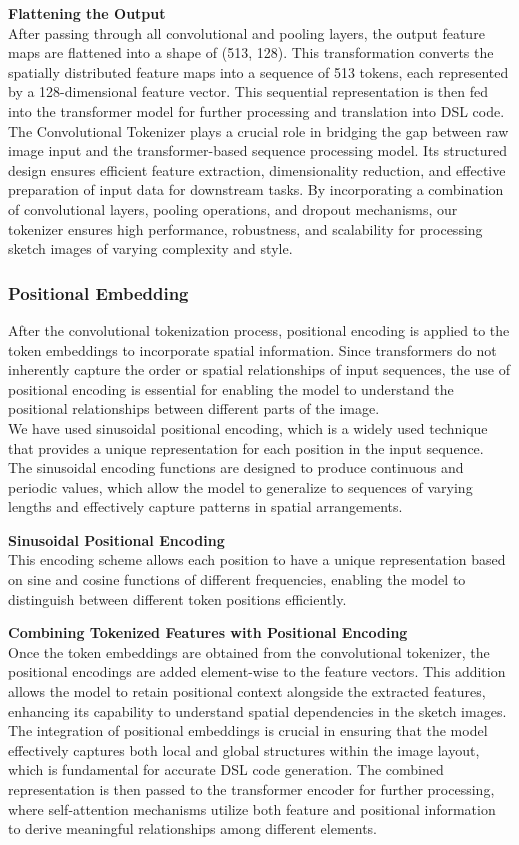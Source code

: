 \textbf{Flattening the Output}\\
After passing through all convolutional and pooling layers, the output feature maps are flattened into a shape of (513, 128). This transformation converts the spatially distributed feature maps into a sequence of 513 tokens, each represented by a 128-dimensional feature vector. This sequential representation is then fed into the transformer model for further processing and translation into DSL code.
The Convolutional Tokenizer plays a crucial role in bridging the gap between raw image input and the transformer-based sequence processing model. Its structured design ensures efficient feature extraction, dimensionality reduction, and effective preparation of input data for downstream tasks. By incorporating a combination of convolutional layers, pooling operations, and dropout mechanisms, our tokenizer ensures high performance, robustness, and scalability for processing sketch images of varying complexity and style.

\subsubsection{Positional Embedding}
After the convolutional tokenization process, positional encoding is applied to the token embeddings to incorporate spatial information. Since transformers do not inherently capture the order or spatial relationships of input sequences, the use of positional encoding is essential for enabling the model to understand the positional relationships between different parts of the image.\\
We have used sinusoidal positional encoding, which is a widely used technique that provides a unique representation for each position in the input sequence. The sinusoidal encoding functions are designed to produce continuous and periodic values, which allow the model to generalize to sequences of varying lengths and effectively capture patterns in spatial arrangements.

\textbf{Sinusoidal Positional Encoding}\\
This encoding scheme allows each position to have a unique representation based on sine and cosine functions of different frequencies, enabling the model to distinguish between different token positions efficiently.

\textbf{Combining Tokenized Features with Positional Encoding}\\
Once the token embeddings are obtained from the convolutional tokenizer, the positional encodings are added element-wise to the feature vectors. This addition allows the model to retain positional context alongside the extracted features, enhancing its capability to understand spatial dependencies in the sketch images.
The integration of positional embeddings is crucial in ensuring that the model effectively captures both local and global structures within the image layout, which is fundamental for accurate DSL code generation. The combined representation is then passed to the transformer encoder for further processing, where self-attention mechanisms utilize both feature and positional information to derive meaningful relationships among different elements.


